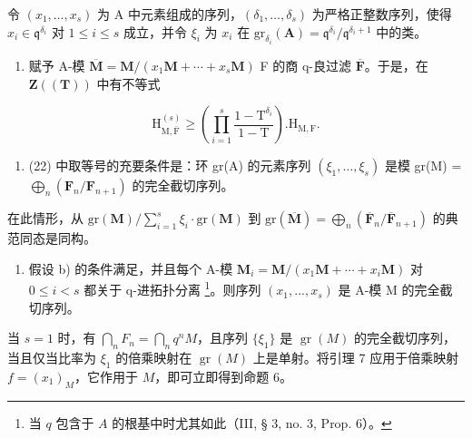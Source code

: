 令 \((x_{1},\ldots,x_{s})\) 为 A 中元素组成的序列，\((\delta_{1},\ldots,\delta_{s})\) 为严格正整数序列，使得 \(x_{i}\in\mathfrak{q}^{\delta_{i}}\) 对 \(1\leqslant i\leqslant s\) 成立，并令 \(\xi_{i}\) 为 \(x_{i}\) 在 \(\mathrm{gr}_{\delta_{i}}(\mathbf{A})=\mathfrak{q}^{\delta_{i}}/\mathfrak{q}^{\delta_{i}+1}\) 中的类。

\begin{enumerate}
\def\labelenumi{\alph{enumi})}
\tightlist
\item
  赋予 A-模 \(\overline{\mathbf{M}} = \mathbf{M}/(x_1\mathbf{M} + \cdots + x_s\mathbf{M})\) F 的商 q-良过滤 \(\overline{\mathbf{F}}\)。于是，在 \(\mathbf{Z}((\mathbf{T}))\) 中有不等式
\end{enumerate}

\[
\mathrm{H} _ {\mathrm{M}, \overline {{\mathrm{F}}}} ^ {(s)} \geqslant \left(\prod_ {i = 1} ^ {s} \frac {1 - \mathrm{T} ^ {\delta_ {i}}}{1 - \mathrm{T}}\right). \mathrm{H} _ {\mathrm{M}, \mathrm{F}}.\tag{22}
\]

\begin{enumerate}
\def\labelenumi{\alph{enumi})}
\setcounter{enumi}{1}
\tightlist
\item
  (22) 中取等号的充要条件是：环 gr(A) 的元素序列 \((\xi_1, \ldots, \xi_s)\) 是模 gr(M) = \(\bigoplus_{n} (\mathbf{F}_n / \mathbf{F}_{n+1})\) 的完全截切序列。
\end{enumerate}

在此情形，从 \(\mathrm{gr}(\mathbf{M}) / \sum_{i=1}^{s} \xi_i \cdot \mathrm{gr}(\mathbf{M})\) 到 \(\mathrm{gr}(\overline{\mathbf{M}}) = \bigoplus_{n} (\overline{\mathbf{F}}_n / \overline{\mathbf{F}}_{n+1})\) 的典范同态是同构。

\begin{enumerate}
\def\labelenumi{\alph{enumi})}
\setcounter{enumi}{2}
\tightlist
\item
  假设 b) 的条件满足，并且每个 A-模 \(\mathbf{M}_{i} = \mathbf{M}/(x_{1}\mathbf{M} + \cdots + x_{i}\mathbf{M})\) 对 \(0 \leqslant i < s\) 都关于 q-进拓扑分离 \footnote{当 \(q\) 包含于 \(A\) 的根基中时尤其如此（III, § 3, no. 3, Prop. 6）。}。则序列 \((x_{1}, ..., x_{s})\) 是 A-模 M 的完全截切序列。
\end{enumerate}

当 \(s = 1\) 时，有 \(\bigcap_{n} F_{n} = \bigcap_{n} q^{n} M\)，且序列 \(\{\xi_{1}\}\) 是 \(\operatorname{gr}(M)\) 的完全截切序列，当且仅当比率为 \(\xi_{1}\) 的倍乘映射在 \(\operatorname{gr}(M)\) 上是单射。将引理 7 应用于倍乘映射 \(f = (x_{1})_{M}\)，它作用于 \(M\)，即可立即得到命题 6。

